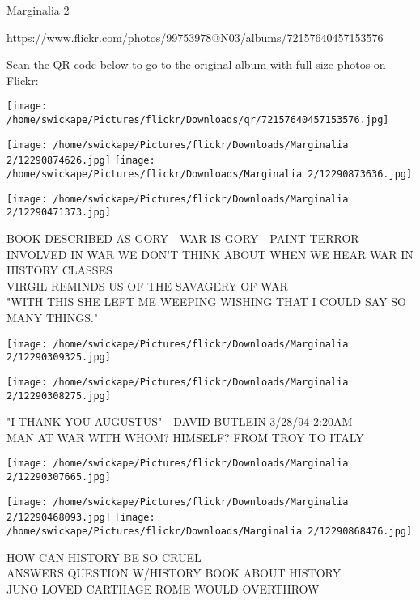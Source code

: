 \documentclass[10pt,letterpaper]{article}
\begin{document}
Marginalia 2

https://www.flickr.com/photos/99753978@N03/albums/72157640457153576

Scan the QR code below to go to the original album with full-size photos on Flickr:

\texttt{[image: /home/swickape/Pictures/flickr/Downloads/qr/72157640457153576.jpg]}
\pagebreak

\texttt{[image: /home/swickape/Pictures/flickr/Downloads/Marginalia 2/12290874626.jpg]}
\texttt{[image: /home/swickape/Pictures/flickr/Downloads/Marginalia 2/12290873636.jpg]}

\vspace{0.25in}
\texttt{[image: /home/swickape/Pictures/flickr/Downloads/Marginalia 2/12290471373.jpg]}

BOOK DESCRIBED AS GORY {-} WAR IS GORY {-} PAINT TERROR INVOLVED IN WAR WE DON'T THINK ABOUT WHEN WE HEAR WAR IN HISTORY CLASSES\\
VIRGIL REMINDS US OF THE SAVAGERY OF WAR\\
"WITH THIS SHE LEFT ME WEEPING WISHING THAT I COULD SAY SO MANY THINGS."\\
\pagebreak

\texttt{[image: /home/swickape/Pictures/flickr/Downloads/Marginalia 2/12290309325.jpg]}

\vspace{0.25in}
\texttt{[image: /home/swickape/Pictures/flickr/Downloads/Marginalia 2/12290308275.jpg]}

"I THANK YOU AUGUSTUS" {-} DAVID BUTLEIN 3/28/94 2:20AM\\
MAN AT WAR WITH WHOM? HIMSELF? FROM TROY TO ITALY\\
\pagebreak

\texttt{[image: /home/swickape/Pictures/flickr/Downloads/Marginalia 2/12290307665.jpg]}

\vspace{0.25in}
\texttt{[image: /home/swickape/Pictures/flickr/Downloads/Marginalia 2/12290468093.jpg]}
\texttt{[image: /home/swickape/Pictures/flickr/Downloads/Marginalia 2/12290868476.jpg]}

HOW CAN HISTORY BE SO CRUEL\\
ANSWERS QUESTION W/HISTORY BOOK ABOUT HISTORY\\
JUNO LOVED CARTHAGE ROME WOULD OVERTHROW\\
\pagebreak
\end{document}
